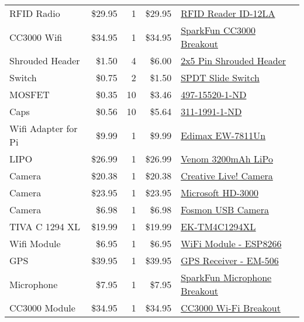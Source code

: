 \begin{table}[h]
\begin{tabular}{lrrrl}
        RFID Radio & \$29.95 & 1 & \$29.95 & \href{https://www.sparkfun.com/products/11827}{RFID Reader ID-12LA}\\
        CC3000 Wifi & \$34.95 & 1 & \$34.95 & \href{https://www.sparkfun.com/products/12072}{SparkFun CC3000 Breakout}\\
        Shrouded Header & \$1.50 & 4 & \$6.00 & \href{https://www.sparkfun.com/products/8506}{2x5 Pin Shrouded Header}\\
        Switch & \$0.75 & 2 & \$1.50 & \href{https://www.sparkfun.com/products/9609}{SPDT Slide Switch}\\
        MOSFET & \$0.35 & 10 & \$3.46 & \href{https://www.digikey.com/product-detail/en/STR2P3LLH6/497-15520-1-ND/5244875}{497-15520-1-ND}\\
        Caps & \$0.56 & 10 & \$5.64 & \href{https://www.digikey.com/product-detail/en/CC1206MKX5R5BB107/311-1991-1-ND/5195893}{311-1991-1-ND}\\
        Wifi Adapter for Pi & \$9.99 & 1 & \$9.99 & \href{http://www.amazon.com/gp/product/B003MTTJOY?psc=1&redirect=true&ref\_=oh\_aui\_detailpage\_o01\_s00}{Edimax EW-7811Un}\\
        LIPO & \$26.99 & 1 & \$26.99 & \href{http://www.amazon.com/gp/product/B00177VKS6?psc=1&redirect=true&ref\_=oh\_aui\_detailpage\_o02\_s00}{Venom 3200mAh LiPo}\\
        Camera & \$20.38 & 1 & \$20.38 & \href{http://www.amazon.com/gp/product/B004431UBM?psc=1&redirect=true&ref\_=od\_aui\_detailpages00}{Creative Live! Camera}\\
        Camera & \$23.95 & 1 & \$23.95 & \href{http://www.amazon.com/gp/product/B008ZVRAQS?psc=1&redirect=true&ref\_=od\_aui\_detailpages00}{Microsoft HD-3000}\\
        Camera & \$6.98 & 1 & \$6.98 & \href{http://www.amazon.com/gp/product/B008GWPC1Q?psc=1&redirect=true&ref\_=od\_aui\_detailpages01}{Fosmon USB Camera}\\
        TIVA C 1294 XL & \$19.99 & 1 & \$19.99 & \href{https://store.ti.com/tiva-connected-launchpad.aspx}{EK-TM4C1294XL}\\
        Wifi Module & \$6.95 & 1 & \$6.95 & \href{https://www.sparkfun.com/products/13678}{WiFi Module - ESP8266}\\
        GPS & \$39.95 & 1 & \$39.95 & \href{https://www.sparkfun.com/products/12751}{GPS Receiver - EM-506}\\
        Microphone & \$7.95 & 1 & \$7.95 & \href{https://www.sparkfun.com/products/9964}{SparkFun Microphone Breakout}\\
        CC3000 Module & \$34.95 & 1 & \$34.95 & \href{http://www.amazon.com/CC3000-WiFi-Module-Breakout-Sparkfun/dp/B00MYL0POO/ref=sr\_1\_9?rps=1&ie=UTF8&qid=1449696154&sr=8-9&keywords=cc3000+breakout&refinements=p\_85\%3A2470955011}{CC3000 Wi-Fi Breakout}\\
    \end{tabular}
    \label{tab:parts_2}
\end{table}
